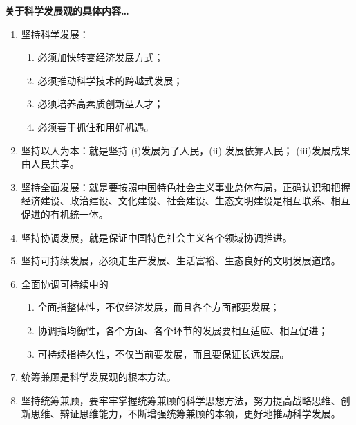 \documentclass[UTF8]{ctexart}
\begin{document}
\begin{mybox}{8}
\textbf{关于科学发展观的具体内容…}
\begin{enumerate}
  \item 坚持科学发展：
  \begin{enumerate}[label={\roman{enumii})}, start=1]
    \item 必须加快转变经济发展方式；
    \item 必须推动科学技术的跨越式发展；
    \item 必须培养高素质创新型人才；
    \item 必须善于抓住和用好机遇。
  \end{enumerate}
  \item 坚持以人为本：就是坚持 (i)发展为了人民，(ii) 发展依靠人民； (iii)发展成果由人民共享。
  \item 坚持全面发展：就是要按照中国特色社会主义事业总体布局，正确认识和把握经济建设、政治建设、文化建设、社会建设、生态文明建设是相互联系、相互促进的有机统一体。
  \item 坚持协调发展，就是保证中国特色社会主义各个领域协调推进。
  \item 坚持可持续发展，必须走生产发展、生活富裕、生态良好的文明发展道路。
  \item 全面协调可持续中的
  \begin{enumerate}[label={\roman{enumii})}, start=1]
    \item 全面指整体性，不仅经济发展，而且各个方面都要发展；
    \item 协调指均衡性，各个方面、各个环节的发展要相互适应、相互促进；
    \item 可持续指持久性，不仅当前要发展，而且要保证长远发展。
  \end{enumerate}
  \item 统筹兼顾是科学发展观的根本方法。
  \item 坚持统筹兼顾，要牢牢掌握统筹兼顾的科学思想方法，努力提高战略思维、创新思维、辩证思维能力，不断增强统筹兼顾的本领，更好地推动科学发展。
\end{enumerate}
\end{mybox}
\end{document}
